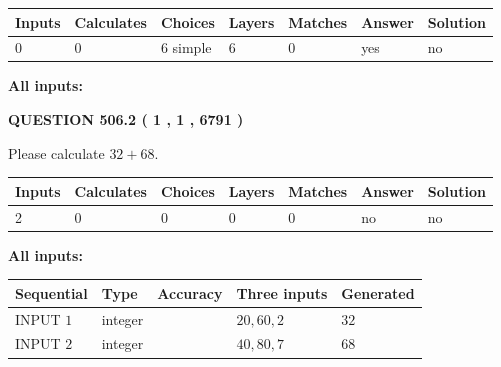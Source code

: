 \documentclass[12pt]{article}
\begin{document}
 
   
   
   
   
\noindent\begin{tabular}{|l|l|l|l|l|l|l|}
 \hline
Inputs & Calculates & Choices & Layers & Matches & Answer & Solution \\ \hline
 0  & 
 0  & 
 6
  simple  
  & 
 6  & 
 0  & 
  yes & 
  no 
  \\ \hline
 \end{tabular}
   
   
   
   
\noindent{}
   
   
   
   
\noindent\vspace{0.1in}\hspace{-0.08in} {\textbf{\Large{All inputs: }}}
   
   
  
\vspace{0.2in}
  
{\textbf{\Large{QUESTION
506.2 
 ( 1 , 1 , 6791 )
}}}
  
  
 
Please calculate $ %
32 +  %
68 $.
 
 
   
   
   
   
\noindent\begin{tabular}{|l|l|l|l|l|l|l|}
 \hline
Inputs & Calculates & Choices & Layers & Matches & Answer & Solution \\ \hline
 2  & 
 0  & 
 0
  & 
 0  & 
 0  & 
  no & 
  no 
  \\ \hline
 \end{tabular}
   
   
   
   
\noindent{}
   
   
   
   
\noindent\vspace{0.1in}\hspace{-0.08in} {\textbf{\Large{All inputs: }}}
   
   
  
  
\noindent\begin{tabular}{|l|l|l|l|l|}
\hline
 Sequential & Type & Accuracy & Three inputs & Generated \\ 
\hline
 
 
  INPUT $  1 $ & integer &  & $
 20
 , 
 60
 , 
 2
 $ & $ 32 $ 
 \\  \hline  
 
 
  INPUT $  2 $ & integer &  & $
 40
 , 
 80
 , 
 7
 $ & $ 68 $ 
 \\  \hline  
 \end{tabular}
   
\end{document}
